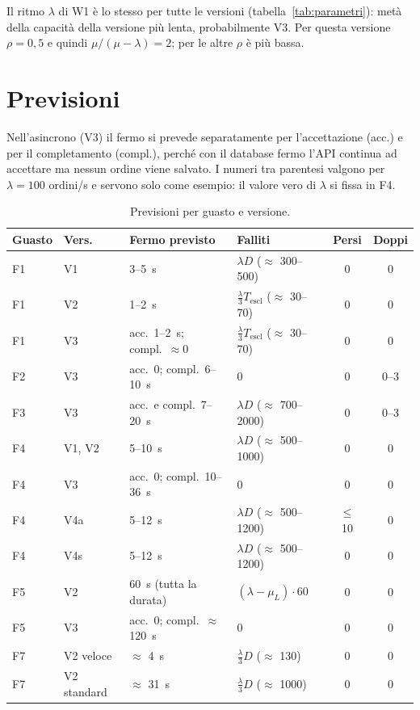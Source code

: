 Il ritmo $\lambda$ di W1 è lo stesso per tutte le versioni (tabella~\ref{tab:parametri}): metà della capacità della versione più lenta, probabilmente V3. Per questa versione $\rho = 0{,}5$ e quindi $\mu / (\mu - \lambda) = 2$; per le altre $\rho$ è più bassa.

\section{Previsioni}

Nell'asincrono (V3) il fermo si prevede separatamente per l'accettazione (acc.) e per il completamento (compl.), perché con il database fermo l'API continua ad accettare ma nessun ordine viene salvato. I numeri tra parentesi valgono per $\lambda = 100$ ordini/s e servono solo come esempio: il valore vero di $\lambda$ si fissa in F4.

\begin{table}[htbp]
\centering
\caption{Previsioni per guasto e versione.}
\label{tab:previsioni}
\small
\begin{tabularx}{\linewidth}{@{}llLLcc@{}}
\toprule
\textbf{Guasto} & \textbf{Vers.} & \textbf{Fermo previsto} & \textbf{Falliti} & \textbf{Persi} & \textbf{Doppi} \\
\midrule
F1 & V1 & 3--5~s & $\lambda D$ ($\approx$ 300--500) & 0 & 0 \\
F1 & V2 & 1--2~s & $\frac{\lambda}{3} T_{\text{escl}}$ ($\approx$ 30--70) & 0 & 0 \\
F1 & V3 & acc.\ 1--2~s; compl.\ $\approx 0$ & $\frac{\lambda}{3} T_{\text{escl}}$ ($\approx$ 30--70) & 0 & 0 \\
F2 & V3 & acc.\ 0; compl.\ 6--10~s & 0 & 0 & 0--3 \\
F3 & V3 & acc.\ e compl.\ 7--20~s & $\lambda D$ ($\approx$ 700--2000) & 0 & 0--3 \\
F4 & V1, V2 & 5--10~s & $\lambda D$ ($\approx$ 500--1000) & 0 & 0 \\
F4 & V3 & acc.\ 0; compl.\ 10--36~s & 0 & 0 & 0 \\
F4 & V4a & 5--12~s & $\lambda D$ ($\approx$ 500--1200) & $\le$ 10 & 0 \\
F4 & V4s & 5--12~s & $\lambda D$ ($\approx$ 500--1200) & 0 & 0 \\
F5 & V2 & 60~s (tutta la durata) & $(\lambda - \mu_L) \cdot 60$ & 0 & 0 \\
F5 & V3 & acc.\ 0; compl.\ $\approx$ 120~s & 0 & 0 & 0 \\
F7 & V2 veloce & $\approx$ 4~s & $\frac{\lambda}{3} D$ ($\approx$ 130) & 0 & 0 \\
F7 & V2 standard & $\approx$ 31~s & $\frac{\lambda}{3} D$ ($\approx$ 1000) & 0 & 0 \\
\bottomrule
\end{tabularx}
\end{table}

